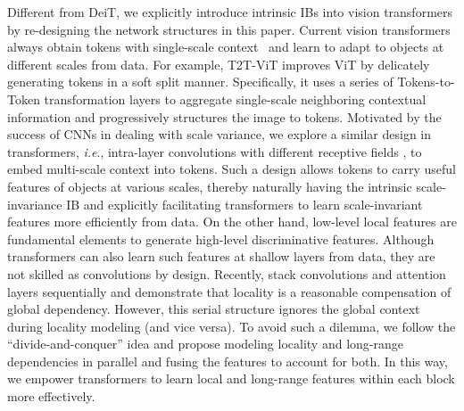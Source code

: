 \documentclass[twocolumn]{svjour3}          \smartqed  \usepackage{natbib}
\newcommand{\ie}{i.e}
\def\onedot{.\xspace}
\def\ie{\emph{i.e}\onedot}
\begin{document}
Different from DeiT, we explicitly introduce intrinsic IBs into vision transformers by re-designing the network structures in this paper. Current vision transformers always obtain tokens with single-scale context~\citep{dosovitskiy2020image,yuan2021tokens,wang2021pyramid,liu2021swin} and learn to adapt to objects at different scales from data. For example, T2T-ViT \citep{yuan2021tokens} improves ViT by delicately generating tokens in a soft split manner. Specifically, it uses a series of Tokens-to-Token transformation layers to aggregate single-scale neighboring contextual information and progressively structures the image to tokens.
Motivated by the success of CNNs in dealing with scale variance, we explore a similar design in transformers, \ie, intra-layer convolutions with different receptive fields \citep{szegedy2017inception,yu2017dilated}, to embed multi-scale context into tokens. Such a design allows tokens to carry useful features of objects at various scales, thereby naturally having the intrinsic scale-invariance IB and explicitly facilitating transformers to learn scale-invariant features more efficiently from data. On the other hand, low-level local features are fundamental elements to generate high-level discriminative features. Although transformers can also learn such features at shallow layers from data, they are not skilled as convolutions by design. Recently, \citep{yan2021contnet,li2021localvit,graham2021levit} stack convolutions and attention layers sequentially and demonstrate that locality is a reasonable compensation of global dependency. However, this serial structure ignores the global context during locality modeling (and vice versa). To avoid such a dilemma, we follow the ``divide-and-conquer'' idea and propose modeling locality and long-range dependencies in parallel and fusing the features to account for both. In this way, we empower transformers to learn local and long-range features within each block more effectively. 
\end{document}
